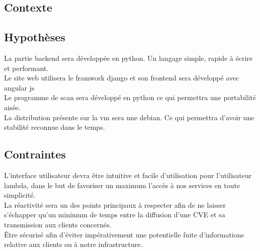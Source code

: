 \textcolor{myBlue}{\chapter{Contexte}}
\section{Hypothèses}
La partie backend sera développée en python. Un langage simple, rapide à écrire et performant.\\
Le site web utilisera le framwork django et son frontend sera développé avec angular js\\
Le programme de scan sera développé en python ce qui permettra une portabilité aisée.\\
La distribution présente sur la vm sera une debian. Ce qui permettra d’avoir une stabilité reconnue dans le temps.\\

\section{Contraintes}
L’interface utilisateur devra être intuitive et facile d’utilisation pour l’utilisateur lambda, dans le but de favoriser un maximum l’accès à nos services en toute simplicité.\\
La réactivité sera un des points principaux à respecter afin de ne laisser s’échapper qu’un minimum de temps entre la diffusion d’une CVE et sa transmission aux clients concernés.\\
Être sécurisé afin d’éviter impérativement une potentielle fuite d’informations relative aux clients ou à notre infrastructure.